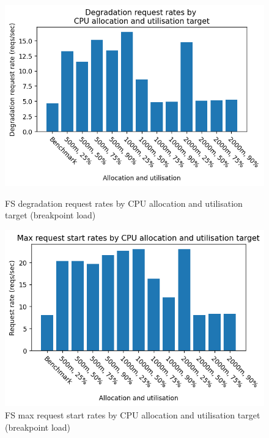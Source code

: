 \begin{figure}[H]
    \centering
    \begin{minipage}{.45\textwidth}
        \centering
        \includegraphics[width=\linewidth]{figures/fs-rau-breakpoint-degradation-rates.png}
        \caption{FS degradation request rates by CPU allocation and utilisation target (breakpoint load)}
        \label{figure:fs-resource-allocation-deg-comp-breakpoint}
    \end{minipage}%
    \hspace{0.05\textwidth} %
    \begin{minipage}{.45\textwidth}
      \centering
      \includegraphics[width=\linewidth]{figures/fs-rau-max-request-start-breakpoint.png}

      \caption{FS max request start rates by CPU allocation and utilisation target (breakpoint load)}
      \label{figure:fs-resource-allocation-breakpoint-max-start-rates}
    \end{minipage}
\end{figure}

